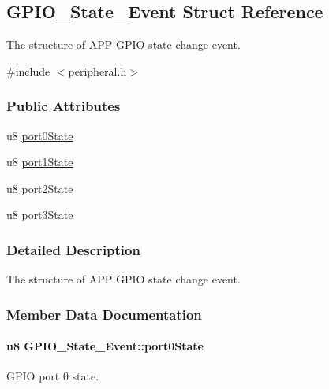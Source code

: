 \hypertarget{struct_g_p_i_o___state___event}{}\subsection{G\+P\+I\+O\+\_\+\+State\+\_\+\+Event Struct Reference}
\label{struct_g_p_i_o___state___event}


The structure of A\+PP G\+P\+IO state change event.  




{\ttfamily \#include $<$peripheral.\+h$>$}

\subsubsection*{Public Attributes}
\begin{DoxyCompactItemize}
\item 
u8 \hyperlink{struct_g_p_i_o___state___event_a7fee391f6bc28b5738a6ef2578a2d9e1}{port0\+State}
\item 
u8 \hyperlink{struct_g_p_i_o___state___event_a133490416bcbd1d0db1d751df81be927}{port1\+State}
\item 
u8 \hyperlink{struct_g_p_i_o___state___event_ab371682e22ac0d55fe6d4a019e5dd26f}{port2\+State}
\item 
u8 \hyperlink{struct_g_p_i_o___state___event_ad349a7829aa9ba5700a08be2167f9f32}{port3\+State}
\end{DoxyCompactItemize}


\subsubsection{Detailed Description}
The structure of A\+PP G\+P\+IO state change event. 

\subsubsection{Member Data Documentation}
\paragraph[{\texorpdfstring{port0\+State}{port0State}}]{\setlength{\rightskip}{0pt plus 5cm}u8 G\+P\+I\+O\+\_\+\+State\+\_\+\+Event\+::port0\+State}\hypertarget{struct_g_p_i_o___state___event_a7fee391f6bc28b5738a6ef2578a2d9e1}{}\label{struct_g_p_i_o___state___event_a7fee391f6bc28b5738a6ef2578a2d9e1}
G\+P\+IO port 0 state. 
